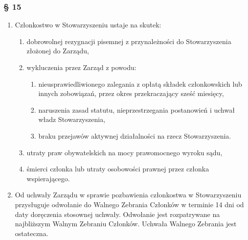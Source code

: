 \documentclass{article}
\newcommand{\myparagraph}[1]{\subsubsection*{#1}}
\begin{document}
\myparagraph{§ 15}
\begin{enumerate}
\item
  Członkostwo w Stowarzyszeniu ustaje na skutek:
  \begin{enumerate}
  \def\labelenumii{\alph{enumii}.}
  \item
    dobrowolnej rezygnacji pisemnej z przynależności do Stowarzyszenia złożonej do Zarządu,
  \item
    wykluczenia przez Zarząd z powodu:
    \begin{enumerate}
    \def\labelenumiii{\roman{enumiii}.}
    \item
      nieusprawiedliwionego zalegania z opłatą składek członkowskich lub innych zobowiązań, przez okres przekraczający sześć miesięcy,
    \item
      naruszenia zasad statutu, nieprzestrzegania postanowień i uchwał władz Stowarzyszenia,
    \item
      braku przejawów aktywnej działalności na rzecz Stowarzyszenia.
    \end{enumerate}
  \item
    utraty praw obywatelskich na mocy prawomocnego wyroku sądu,
  \item
    śmierci członka lub utraty osobowości prawnej przez członka
    wspierającego.
  \end{enumerate}
\item
  Od uchwały Zarządu w sprawie pozbawienia członkostwa w Stowarzyszeniu przysługuje odwołanie do Walnego Zebrania Członków w terminie 14 dni od daty doręczenia stosownej uchwały. Odwołanie jest rozpatrywane na najbliższym Walnym Zebraniu Członków. Uchwała Walnego Zebrania jest ostateczna.
\end{enumerate}
\end{document}
